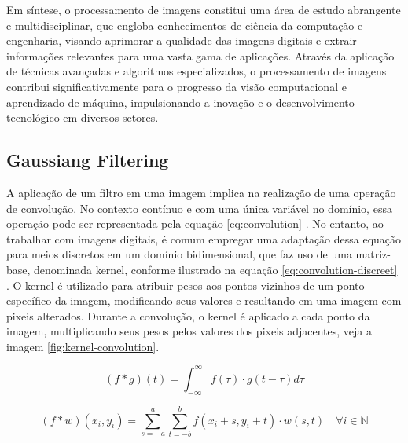 Em síntese, o processamento de imagens constitui uma área de estudo abrangente e multidisciplinar, que engloba conhecimentos de ciência da computação e engenharia, visando aprimorar a qualidade das imagens digitais e extrair informações relevantes para uma vasta gama de aplicações. Através da aplicação de técnicas avançadas e algoritmos especializados, o processamento de imagens contribui significativamente para o progresso da visão computacional e aprendizado de máquina, impulsionando a inovação e o desenvolvimento tecnológico em diversos setores.


\subsection{Gaussiang Filtering}

A aplicação de um filtro em uma imagem implica na realização de uma operação de convolução. No contexto contínuo e com uma única variável no domínio, essa operação pode ser representada pela equação \ref{eq:convolution} \cite{spiegel_schaums_1974}. No entanto, ao trabalhar com imagens digitais, é comum empregar uma adaptação dessa equação para meios discretos em um domínio bidimensional, que faz uso de uma matriz-base, denominada kernel, conforme ilustrado na equação \ref{eq:convolution-discreet} \cite{gonzalez_rafael_c_digital_2018}. O kernel é utilizado para atribuir pesos aos pontos vizinhos de um ponto específico da imagem, modificando seus valores e resultando em uma imagem com pixeis alterados. Durante a convolução, o kernel é aplicado a cada ponto da imagem, multiplicando seus pesos pelos valores dos pixeis adjacentes, veja a imagem \ref{fig:kernel-convolution}. 

\begin{equation}
(f * g)(t) = \int_{-\infty}^{\infty} f(\tau) \cdot g(t-\tau) d\tau
\label{eq:convolution}
\end{equation}

\begin{equation}
(f * w)(x_i, y_i) = \sum_{s=-a}^{a} \sum_{t=-b}^{b} f(x_i +s, y_i +t) \cdot w(s, t) \quad \forall i \in \mathbb{N}
\label{eq:convolution-discreet}
\end{equation}\\


